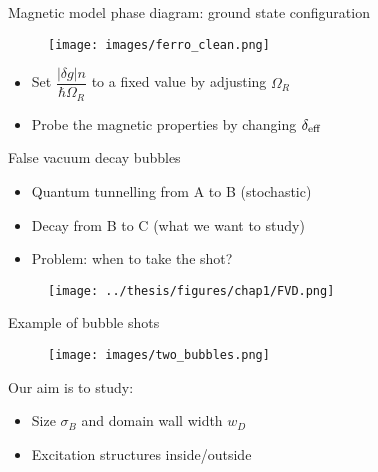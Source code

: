 \documentclass[aspectratio=169]{beamer}
\begin{document}
\begin{frame}{Magnetic model phase diagram: ground state configuration}
  \begin{minipage}{0.7\textwidth}
    \begin{figure}
      \centering
      \texttt{[image: images/ferro\_clean.png]}
    \end{figure} 
  \end{minipage}
  \hspace{0.01\textwidth}
  \begin{minipage}{0.27\textwidth}
    \begin{itemize}
      \item Set $\dfrac{|\delta g| n}{\hbar\Omega_R}$ to a fixed value by adjusting $\Omega_R$
      \item Probe the magnetic properties by changing $\delta_{\rm eff}$
    \end{itemize}
  \end{minipage}
\end{frame} 

\begin{frame}{False vacuum decay bubbles}
  \begin{minipage}{0.32\textwidth}
    \begin{itemize}
      \item Quantum tunnelling from A to B (stochastic)
      \item Decay from B to C (what we want to study)
      \item Problem: when to take the shot?
    \end{itemize}
  \end{minipage}
  \hspace{0.01\textwidth}
  \begin{minipage}{0.65\textwidth}
    \begin{figure}
      \centering
      \texttt{[image: ../thesis/figures/chap1/FVD.png]}
    \end{figure} 
  \end{minipage}
\end{frame}

\begin{frame}{Example of bubble shots}
  \begin{figure}
    \centering
    \texttt{[image: images/two\_bubbles.png]}
  \end{figure}
  Our aim is to study:
  \begin{itemize}
    \item Size $\sigma_B$ and domain wall width $w_D$
    \item Excitation structures inside/outside
  \end{itemize}
\end{frame}
\end{document}
